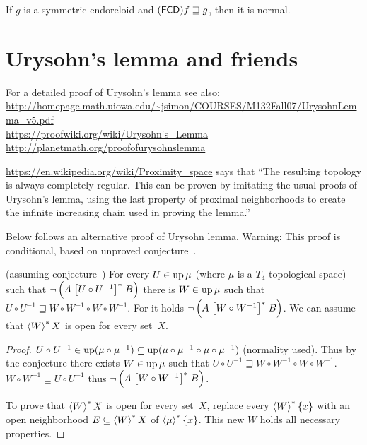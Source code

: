 \begin{cor}
If $g$ is a symmetric endoreloid and $(\mathsf{FCD}) f\sqsupseteq g$, then it is normal.
\end{cor}

\section{Urysohn's lemma and friends}

For a detailed proof of Urysohn's lemma see also:\\
\url{http://homepage.math.uiowa.edu/~jsimon/COURSES/M132Fall07/UrysohnLemma_v5.pdf}\\
\url{https://proofwiki.org/wiki/Urysohn's_Lemma}\\
\url{http://planetmath.org/proofofurysohnslemma}

\url{https://en.wikipedia.org/wiki/Proximity_space} says that
``The resulting topology is always completely regular. This can be proven by imitating the usual proofs of Urysohn's lemma, using the last property of proximal neighborhoods to create the infinite increasing chain used in proving the lemma.''

Below follows an alternative proof of Urysohn lemma. Warning: This proof is conditional,
based on unproved conjecture~.

\begin{lem}
  (assuming conjecture~) For every $U \in \operatorname{up} \mu$ (where $\mu$ is a $T_4$ topological space) such that
  $\neg \left( A \mathrel{\left[U \circ U^{- 1}\right]^{\ast}} B \right)$ there is $W \in
  \operatorname{up} \mu$ such that $U \circ U^{- 1} \sqsupseteq W \circ W^{- 1}
  \circ W \circ W^{- 1}$. For it holds $\neg \left( A \mathrel{\left[W \circ W^{-
  1}\right]^{\ast}} B \right)$.
  We can assume that $\left\langle W\right\rangle ^{\ast}X$ is open for every set~$X$.
\end{lem}

\begin{proof}
  $U \circ U^{- 1} \in \operatorname{up} (\mu \circ \mu^{- 1}) \subseteq
  \operatorname{up} (\mu \circ \mu^{- 1} \circ \mu \circ
  \mu^{- 1})$ (normality used). Thus by the conjecture there exists $W
  \in \operatorname{up} \mu$ such that $U \circ U^{- 1} \sqsupseteq W \circ W^{-
  1} \circ W \circ W^{- 1}$. $W \circ W^{- 1} \sqsubseteq U \circ U^{- 1}$
  thus $\neg \left( A \mathrel{\left[W \circ W^{- 1}\right]^{\ast}} B \right)$.
  
  To prove that $\left\langle W\right\rangle ^{\ast}X$ is open for every set~$X$, replace every $\left\langle W\right\rangle ^{\ast}\{x\}$
  with an open neighborhood $E\subseteq\left\langle W\right\rangle ^{\ast}X$ of $\left\langle \mu\right\rangle ^{\ast}\{x\}$.
  This new $W$ holds all necessary properties.
\end{proof}

